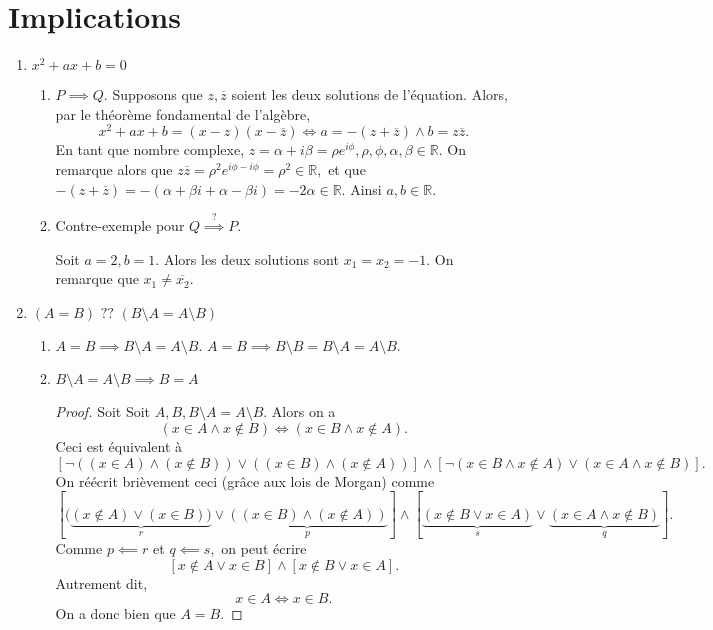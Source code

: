 \documentclass[10pt]{article}
\begin{document}
\section{Implications}
\begin{enumerate}
    \item $x^2+ax+b=0$
    \begin{enumerate}
        \item $P\implies Q.$
    Supposons que $z, \overline{z}$ soient les deux solutions de l'équation. Alors, par le théorème fondamental de l'algèbre, 
    \[x^2 +ax +b = (x-z)(x-\overline{z})\iff a=-(z+\overline{z}) \wedge b= z\overline{z}.\]
    En tant que nombre complexe, $z=\alpha + i\beta =\rho e^{i\phi}, \rho,\phi, \alpha ,\beta \in \mathbb{R}.$ On remarque alors que $z\overline{z}=\rho^2e^{i\phi -i\phi}=\rho ^2 \in \mathbb{R}, $ et que $-(z+\overline{z})=-(\alpha+\beta i+\alpha-\beta i)=-2\alpha \in \mathbb{R}.$ Ainsi  $a, b \in \mathbb{R}.$

    \item Contre-exemple pour $Q \overset{?}{\implies} P.$
    
    Soit $a=2, b=1.$ Alors les deux solutions sont $x_1=x_2=-1.$ On remarque que $x_1\neq \overline{x_2}.$
    \end{enumerate}
    
    \item $(A=B) \text{ ?? } (B\setminus A = A \setminus B)$
    \begin{enumerate}
        \item $A=B \implies B\setminus A =A\setminus B.$
        $A=B \implies B \setminus B = B \setminus A = A \setminus B.$ 
        \item $B\setminus A =A\setminus B \implies  B=A$
        \begin{proof}
        Soit Soit $A,B, B\setminus A = A \setminus B.$ Alors on a 
        \[(x\in A \wedge x \not \in B)\iff (x\in B \wedge x \not \in A).\] Ceci est équivalent à 
        \[\left[\neg ((x\in A )\wedge (x \not \in B))\vee ((x \in B )\wedge(x \not \in A))\right]\wedge \left[\neg (x \in B \wedge x \not \in A) \vee (x \in A \wedge x \not \in B) \right].\]On réécrit brièvement ceci (grâce aux lois de Morgan) comme
        \[\left[ ( \underbrace{(x\not\in A )\vee (x \in B))}_r\vee \underbrace{((x \in B )\wedge (x \not \in A))}_p\right]\wedge \left[ \underbrace{(x \not\in B \vee x  \in A)}_s \vee \underbrace{(x \in A \wedge x \not \in B)}_q \right].\]
        Comme $p\impliedby r$ et $q \impliedby s,$ on peut écrire
        \[\left[x\not\in A \vee x  \in B\right]\wedge \left[x \not\in B \vee x \in A \right].\] Autrement dit,
        \begin{equation}
            x\in A \iff x \in B.
        \end{equation}
        On a donc bien que $A=B.$
        \end{proof}
        
    \end{enumerate}
    
\end{enumerate}
\end{document}
